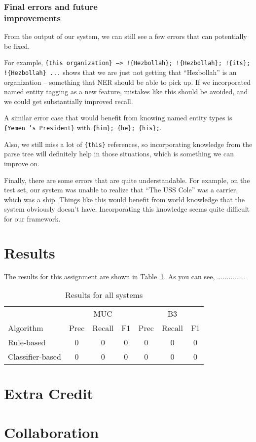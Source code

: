 \documentclass[12pt, twocolumn]{article}
\begin{document}
\subsubsection{Final errors and future\\ improvements}
From the output of our system, we can still see a few errors that can potentially be fixed.

For example, \texttt{\{this organization\} --> !\{Hezbollah\}; !\{Hezbollah\}; !\{its\}; !\{Hezbollah\} ...} shows that we are just not getting that ``Hezbollah'' is an organization -- something that NER should be able to pick up. If we incorporated named entity tagging as a new feature, mistakes like this should be avoided, and we could get substantially improved recall.

A similar error case that would benefit from knowing named entity types is \texttt{\{Yemen 's President\}} with \texttt{\{him\}; \{he\}; \{his\};}.

Also, we still miss a lot of \texttt{\{this\}} references, so incorporating knowledge from the parse tree will definitely help in those situations, which is something we can improve on.

Finally, there are some errors that are quite understandable. For example, on the test set, our system was unable to realize that ``The USS Cole'' was a carrier, which was a ship. Things like this would benefit from world knowledge that the system obviously doesn't have. Incorporating this knowledge seems quite difficult for our framework.
\section{Results}
The results for this assignment are shown in Table~\ref{tab:results}. As you can see, ...............
\begin{table}[b]
\begin{minipage}{\textwidth}
\centering
\begin{tabular}{l|c c c|c c c}
\hline
& & MUC & & & B3 & \\
Algorithm & Prec & Recall & F1 & Prec & Recall & F1 \\\hline
Rule-based & 0 & 0 & 0 & 0 & 0 & 0\\\hline  
Classifier-based & 0 & 0 & 0 & 0 & 0 & 0\\\hline
\end{tabular}
\caption{Results for all systems}\label{tab:results}
\end{minipage}
\end{table}


\section{Extra Credit}

\section{Collaboration} 
\end{document}
